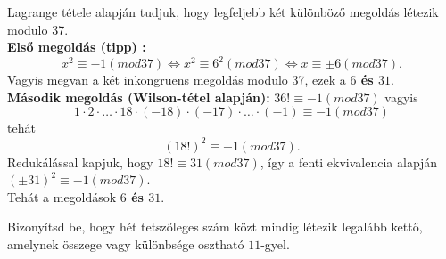\begin{solution}
	Lagrange tétele alapján tudjuk, hogy legfeljebb két különböző megoldás
	létezik modulo 37. \\
	\textbf{Első megoldás (tipp) :} 
	\[
	x^{2}\equiv-1(mod37)\Leftrightarrow x^{2}\equiv6^{2}(mod37)\Leftrightarrow x\equiv\pm6(mod37).
	\]
	Vagyis megvan a két inkongruens megoldás modulo 37, ezek a \textbf{$6$
		és $31$}. \\
	\textbf{Második megoldás (Wilson-tétel alapján):} $36!\equiv-1(mod37)$
	vagyis \\
	
	\[
	1\cdot2\cdot\ldots\cdot18\cdot(-18)\cdot(-17)\cdot\ldots\cdot(-1)\equiv-1(mod37)
	\]
	tehát 
	\[
	(18!)^{2}\equiv-1(mod37).
	\]
	Redukálással kapjuk, hogy $18!\equiv31(mod37)$, így a fenti ekvivalencia
	alapján $(\pm31)^{2}\equiv-1(mod37)$. \\
	Tehát a megoldások \textbf{$6$ és $31$}. 
\end{solution}
\begin{extraproblem}
	Bizonyítsd be, hogy hét tetszőleges szám közt mindig létezik legalább
	kettő, amelynek összege vagy különbsége osztható $11$-gyel. 
\end{extraproblem}

